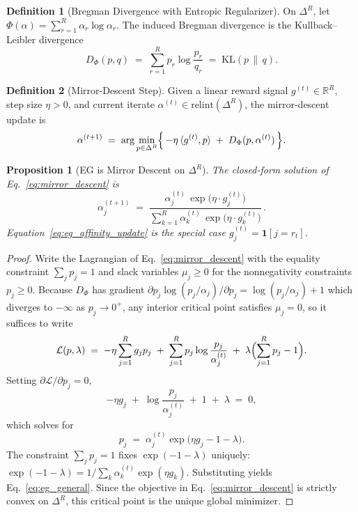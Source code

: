 \documentclass[11pt,a4paper]{article}
\theoremstyle{definition}
\newtheorem{definition}{Definition}[section]
\theoremstyle{plain}
\newtheorem{proposition}{Proposition}[section]
\begin{document}
\begin{definition}[Bregman Divergence with Entropic Regularizer]
On $\Delta^R$, let $\Phi(\alpha) = \sum_{r=1}^{R} \alpha_r \log \alpha_r$.
The induced Bregman divergence is the Kullback--Leibler divergence
\begin{equation}
D_\Phi(p, q) \;=\; \sum_{r=1}^{R} p_r \log \frac{p_r}{q_r}
\;=\; \mathrm{KL}(p \,\|\, q).
\end{equation}
\end{definition}

\begin{definition}[Mirror-Descent Step]
Given a linear reward signal $g^{(t)} \in \mathbb{R}^R$, step size $\eta > 0$,
and current iterate $\alpha^{(t)} \in \mathrm{relint}(\Delta^R)$, the
mirror-descent update is
\begin{equation}
\label{eq:mirror_descent}
\alpha^{(t+1)} \;=\; \arg\min_{p \in \Delta^R}
\Bigl\{\, -\eta \,\langle g^{(t)}, p\rangle \;+\; D_\Phi(p, \alpha^{(t)}) \,\Bigr\}.
\end{equation}
\end{definition}

\begin{proposition}[EG is Mirror Descent on $\Delta^R$]
\label{prop:eg_derivation}
The closed-form solution of Eq.~\eqref{eq:mirror_descent} is
\begin{equation}
\label{eq:eg_general}
\alpha_j^{(t+1)} \;=\;
\frac{\alpha_j^{(t)}\,\exp\!\bigl(\eta \cdot g_j^{(t)}\bigr)}
     {\sum_{k=1}^{R} \alpha_k^{(t)}\,\exp\!\bigl(\eta \cdot g_k^{(t)}\bigr)}\,.
\end{equation}
Equation~\eqref{eq:eg_affinity_update} is the special case $g_j^{(t)} = \mathbf{1}[j = r_t]$.
\end{proposition}

\begin{proof}
Write the Lagrangian of Eq.~\eqref{eq:mirror_descent} with the equality
constraint $\sum_j p_j = 1$ and slack variables $\mu_j \geq 0$ for the
nonnegativity constraints $p_j \geq 0$. Because $D_\Phi$ has gradient
$\partial p_j \log(p_j/\alpha_j) / \partial p_j = \log(p_j/\alpha_j) + 1$
which diverges to $-\infty$ as $p_j \to 0^+$, any interior critical
point satisfies $\mu_j = 0$, so it suffices to write
\[
\mathcal{L}(p, \lambda) \;=\;
-\eta \sum_{j=1}^{R} g_j p_j
\;+\; \sum_{j=1}^{R} p_j \log\frac{p_j}{\alpha_j^{(t)}}
\;+\; \lambda\Bigl(\sum_{j=1}^{R} p_j - 1\Bigr).
\]
Setting $\partial \mathcal{L} / \partial p_j = 0$,
\[
-\eta g_j \;+\; \log\frac{p_j}{\alpha_j^{(t)}} \;+\; 1 \;+\; \lambda \;=\; 0,
\]
which solves for
\[
p_j \;=\; \alpha_j^{(t)} \exp\!\bigl(\eta g_j - 1 - \lambda\bigr).
\]
The constraint $\sum_j p_j = 1$ fixes $\exp(-1-\lambda)$ uniquely:
$\exp(-1-\lambda) = 1 / \sum_k \alpha_k^{(t)} \exp(\eta g_k)$.
Substituting yields Eq.~\eqref{eq:eg_general}. Since the objective in
Eq.~\eqref{eq:mirror_descent} is strictly convex on $\Delta^R$, this
critical point is the unique global minimizer.
\end{proof}
\end{document}
